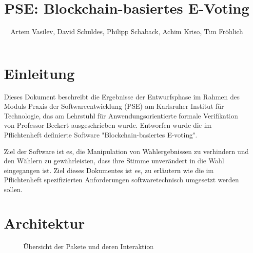 \documentclass[parskip=full]{scrartcl}
\title{PSE: Blockchain-basiertes E-Voting}
\author{Artem Vasilev, David Schuldes, Philipp Schaback, Achim Kriso, Tim Fröhlich}
\begin{document}
	\clearpage
	\maketitle
	\newpage
	
	\tableofcontents
	\newpage
	\section{Einleitung}
	Dieses Dokument beschreibt die Ergebnisse der Entwurfsphase im Rahmen des Moduls Praxis der Softwareentwicklung (PSE) am Karlsruher Institut für Technologie, das am Lehrstuhl für Anwendungsorientierte formale Verifikation von Professor Beckert ausgeschrieben wurde.
	Entworfen wurde die im Pflichtenheft definierte Software "Blockchain-basiertes E-voting". 
	
	Ziel der Software ist es, die Manipulation
	von Wahlergebnissen zu verhindern und den Wählern zu gewährleisten, dass ihre Stimme unverändert in die Wahl eingegangen ist.
	Ziel dieses Dokumentes ist es, zu erläutern wie die im Pflichtenheft spezifizierten Anforderungen softwaretechnisch umgesetzt werden sollen.
	
	\section{Architektur}
	\begin{figure}[!h]
	\centering
	
	\caption{Übersicht der Pakete und deren Interaktion}
	\end{figure}
\end{document}
